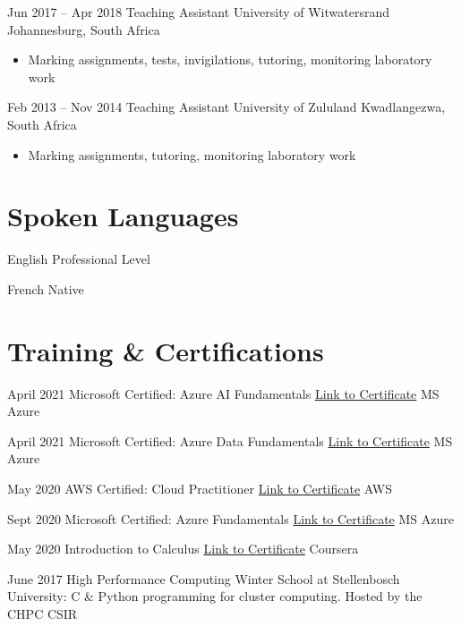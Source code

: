 \documentclass[letterpaper]{moderncv}        %
\begin{document}
\cventry
{Jun 2017 -- Apr 2018}
{Teaching Assistant}
{University of Witwatersrand}
{Johannesburg, South Africa}
{}
{\begin{itemize}%
	\item Marking assignments, tests, invigilations, tutoring, monitoring laboratory work
	\end{itemize}}
\cventry
{Feb 2013 -- Nov 2014}
{Teaching Assistant}
{University of Zululand}
{Kwadlangezwa, South Africa}
{}
{\begin{itemize}%
	\item Marking assignments, tutoring, monitoring laboratory work
	\end{itemize}}

\section{Spoken Languages}

\cventry
{}
{English}
{Professional Level}
{}
{}
{}

\cventry
{}
{French}
{Native}
{}
{}
{}

\section{Training \& Certifications}

\cventry
{April 2021}
{Microsoft Certified: Azure AI Fundamentals}
{\href{https://www.credly.com/badges/80d60ce2-32b0-475e-9959-05b452f9355a/public_url}{Link to Certificate}}
{MS Azure}
{}
{}

\cventry
{April 2021}
{Microsoft Certified: Azure Data Fundamentals}
{\href{https://www.credly.com/badges/a08ad4dc-3cee-4771-9183-561a33e3ae81/public_url}{Link to Certificate}}
{MS Azure}
{}
{}

\cventry
{May 2020}
{AWS Certified: Cloud Practitioner}
{\href{https://www.certmetrics.com/amazon/public/transcript.aspx?transcript=52TEQ442BE4QQ3KC}{Link to Certificate}}
{AWS}
{}
{}

\cventry
{Sept 2020}
{Microsoft Certified: Azure Fundamentals}
{\href{https://www.youracclaim.com/badges/ee4c4a98-5687-4fcf-8fce-7ee92249e54f?source=linked_in_profile}{Link to Certificate}}
{MS Azure}
{}
{}

\cventry
{May 2020}
{Introduction to Calculus}
{\href{https://www.coursera.org/account/accomplishments/verify/VNY949FASZA2}{Link to Certificate}}
{Coursera}
{}
{}

\cventry
{June 2017}
{High Performance Computing Winter School at Stellenbosch University: C \& Python programming for cluster computing.}
{Hosted by the CHPC}
{CSIR}
{}
{}
			
\end{document}

